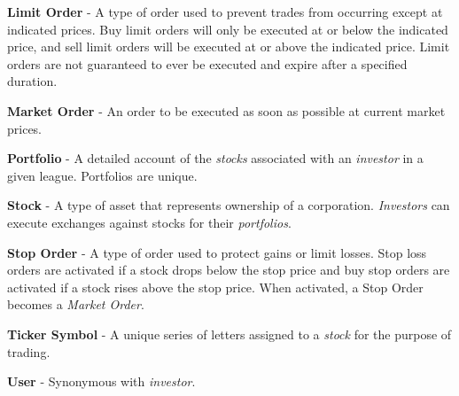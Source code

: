 {\textbf{Limit Order} - A type of order used to prevent trades from occurring except at indicated
prices. Buy limit orders will only be executed at or below the indicated price, and sell limit
orders will be executed at or above the indicated price. Limit orders are not guaranteed to ever
be executed and expire after a specified duration.

\textbf{Market Order} - An order to be executed as soon as possible at current market prices.

\textbf{Portfolio} - A detailed account of the \emph{stocks} associated with an \emph{investor} 
in a given league. Portfolios are unique. 

\textbf{Stock} - A type of asset that represents ownership of a corporation. \emph{Investors} can
execute exchanges against stocks for their \emph{portfolios}.

\textbf{Stop Order} - A type of order used to protect gains or limit losses. Stop loss
orders are activated if a stock drops below the stop price and buy stop orders
are activated if a stock rises above the stop price. When activated, a Stop Order becomes a
\emph{Market Order}. 

\textbf{Ticker Symbol} - A unique series of letters assigned to a \emph{stock} for the purpose of
trading.

\textbf{User} - Synonymous with \emph{investor}.

}